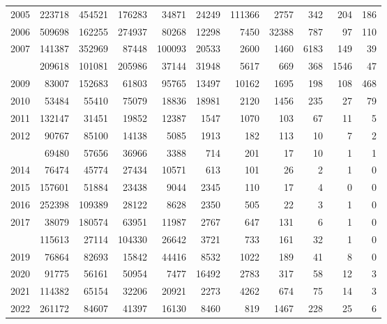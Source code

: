 \documentclass[
]{article}
\begin{document}
\begin{longtable}[t]{lrrrrrrrrrr}
2005 & 223718 & 454521 & 176283 & 34871 & 24249 & 111366 & 2757 & 342 & 204 & 186\\
2006 & 509698 & 162255 & 274937 & 80268 & 12298 & 7450 & 32388 & 787 & 97 & 110\\
2007 & 141387 & 352969 & 87448 & 100093 & 20533 & 2600 & 1460 & 6183 & 149 & 39\\
\addlinespace
2008 & 209618 & 101081 & 205986 & 37144 & 31948 & 5617 & 669 & 368 & 1546 & 47\\
2009 & 83007 & 152683 & 61803 & 95765 & 13497 & 10162 & 1695 & 198 & 108 & 468\\
2010 & 53484 & 55410 & 75079 & 18836 & 18981 & 2120 & 1456 & 235 & 27 & 79\\
2011 & 132147 & 31451 & 19852 & 12387 & 1547 & 1070 & 103 & 67 & 11 & 5\\
2012 & 90767 & 85100 & 14138 & 5085 & 1913 & 182 & 113 & 10 & 7 & 2\\
\addlinespace
2013 & 69480 & 57656 & 36966 & 3388 & 714 & 201 & 17 & 10 & 1 & 1\\
2014 & 76474 & 45774 & 27434 & 10571 & 613 & 101 & 26 & 2 & 1 & 0\\
2015 & 157601 & 51884 & 23438 & 9044 & 2345 & 110 & 17 & 4 & 0 & 0\\
2016 & 252398 & 109389 & 28122 & 8628 & 2350 & 505 & 22 & 3 & 1 & 0\\
2017 & 38079 & 180574 & 63951 & 11987 & 2767 & 647 & 131 & 6 & 1 & 0\\
\addlinespace
2018 & 115613 & 27114 & 104330 & 26642 & 3721 & 733 & 161 & 32 & 1 & 0\\
2019 & 76864 & 82693 & 15842 & 44416 & 8532 & 1022 & 189 & 41 & 8 & 0\\
2020 & 91775 & 56161 & 50954 & 7477 & 16492 & 2783 & 317 & 58 & 12 & 3\\
2021 & 114382 & 65154 & 32206 & 20921 & 2273 & 4262 & 674 & 75 & 14 & 3\\
2022 & 261172 & 84607 & 41397 & 16130 & 8460 & 819 & 1467 & 228 & 25 & 6\\*
\end{longtable}
\end{document}
